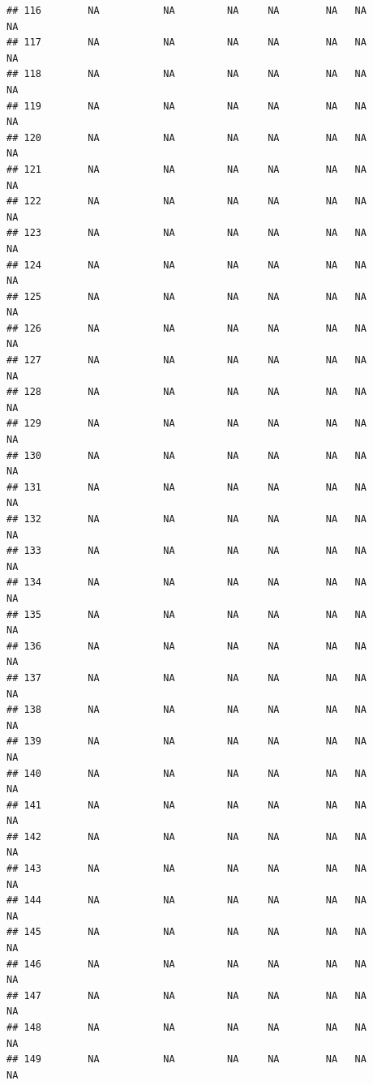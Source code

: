 \documentclass[
]{article}
\begin{document}
\begin{verbatim}
## 116        NA           NA         NA     NA        NA   NA             NA
## 117        NA           NA         NA     NA        NA   NA             NA
## 118        NA           NA         NA     NA        NA   NA             NA
## 119        NA           NA         NA     NA        NA   NA             NA
## 120        NA           NA         NA     NA        NA   NA             NA
## 121        NA           NA         NA     NA        NA   NA             NA
## 122        NA           NA         NA     NA        NA   NA             NA
## 123        NA           NA         NA     NA        NA   NA             NA
## 124        NA           NA         NA     NA        NA   NA             NA
## 125        NA           NA         NA     NA        NA   NA             NA
## 126        NA           NA         NA     NA        NA   NA             NA
## 127        NA           NA         NA     NA        NA   NA             NA
## 128        NA           NA         NA     NA        NA   NA             NA
## 129        NA           NA         NA     NA        NA   NA             NA
## 130        NA           NA         NA     NA        NA   NA             NA
## 131        NA           NA         NA     NA        NA   NA             NA
## 132        NA           NA         NA     NA        NA   NA             NA
## 133        NA           NA         NA     NA        NA   NA             NA
## 134        NA           NA         NA     NA        NA   NA             NA
## 135        NA           NA         NA     NA        NA   NA             NA
## 136        NA           NA         NA     NA        NA   NA             NA
## 137        NA           NA         NA     NA        NA   NA             NA
## 138        NA           NA         NA     NA        NA   NA             NA
## 139        NA           NA         NA     NA        NA   NA             NA
## 140        NA           NA         NA     NA        NA   NA             NA
## 141        NA           NA         NA     NA        NA   NA             NA
## 142        NA           NA         NA     NA        NA   NA             NA
## 143        NA           NA         NA     NA        NA   NA             NA
## 144        NA           NA         NA     NA        NA   NA             NA
## 145        NA           NA         NA     NA        NA   NA             NA
## 146        NA           NA         NA     NA        NA   NA             NA
## 147        NA           NA         NA     NA        NA   NA             NA
## 148        NA           NA         NA     NA        NA   NA             NA
## 149        NA           NA         NA     NA        NA   NA             NA

\end{verbatim}
\end{document}
